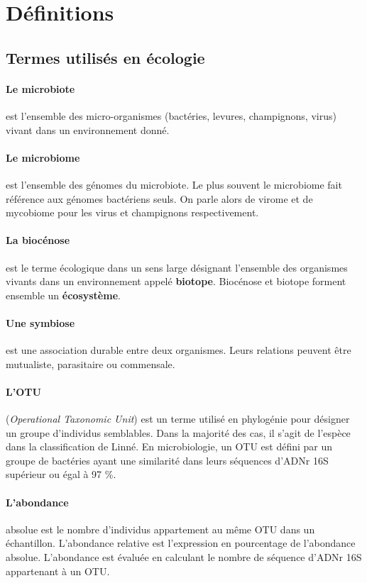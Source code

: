 \documentclass[12pt,a4paper]{article}
\begin{document}
\newpage

\section{Définitions}
\subsection{Termes utilisés en écologie}

\paragraph{Le microbiote\cite{Eisen}} est l’ensemble des micro-organismes (bactéries, levures, champignons, virus) vivant dans un environnement donné.
\paragraph{Le microbiome\cite{Eisen}} est l'ensemble des génomes du microbiote. Le plus souvent le microbiome fait référence aux génomes bactériens seuls. On parle alors de virome et de mycobiome pour les virus et champignons respectivement.

\paragraph{La biocénose} est le terme écologique dans un sens large désignant l'ensemble des organismes vivants dans un environnement appelé \textbf{biotope}. Biocénose et biotope forment ensemble un \textbf{écosystème}.

\paragraph{Une symbiose} est une association durable entre deux organismes. Leurs relations peuvent être mutualiste, parasitaire ou commensale.


\paragraph{L'OTU}(\textit{Operational Taxonomic Unit}) est un terme utilisé en phylogénie pour désigner un groupe d’individus semblables. Dans la majorité des cas, il s'agit de l'espèce dans la classification de Linné.
En microbiologie, un OTU est défini par un groupe de bactéries ayant une similarité dans leurs séquences d'ADNr 16S supérieur ou égal à 97 \%.

\paragraph{L'abondance} absolue est le nombre d'individus appartement au même OTU dans un échantillon.
L’abondance relative est l'expression en pourcentage de l'abondance absolue. L'abondance est évaluée en calculant le nombre de séquence d'ADNr 16S appartenant à un OTU.
\end{document}
